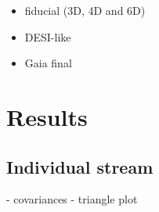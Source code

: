 \documentclass[modern]{aastex61}
\begin{document}
\label{sec:datasets}
\begin{itemize}
 \item fiducial (3D, 4D and 6D)
 \item DESI-like
 \item Gaia final
\end{itemize}


\section{Results}

\subsection{Individual stream}
- covariances
- triangle plot
\end{document}
